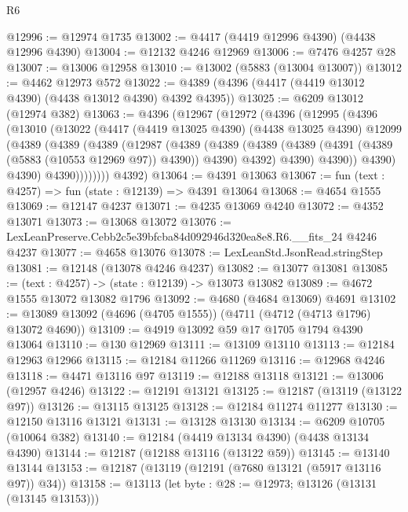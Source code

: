 \begin{lexlean}{R6}
\begin{coremodule}
@12996 := @12974 @1735
@13002 := @4417 (@4419 @12996 @4390) (@4438 @12996 @4390)
@13004 := @12132 @4246 @12969
@13006 := @7476 @4257 @28
@13007 := @13006 @12958
@13010 := @13002 (@5883 (@13004 @13007))
@13012 := @4462 @12973 @572
@13022 := @4389 (@4396 (@4417 (@4419 @13012 @4390) (@4438 @13012 @4390) @4392 @4395))
@13025 := @6209 @13012 (@12974 @382)
@13063 := @4396
    (@12967
      (@12972
        (@4396
          (@12995
            (@4396
              (@13010
                (@13022
                  (@4417
                    (@4419 @13025 @4390)
                    (@4438 @13025 @4390)
                    @12099
                    (@4389
                      (@4389
                        (@4389
                          (@12987
                            (@4389
                              (@4389
                                (@4389
                                  (@4389 (@4391 (@4389 (@5883 (@10553 @12969 @97)) @4390)) @4390)
                                  @4392)
                                @4390)
                              @4390))
                          @4390)
                        @4390)
                      @4390))))))))
      @4392)
@13064 := @4391 @13063
@13067 := fun (text : @4257) => fun (state : @12139) => @4391 @13064
@13068 := @4654 @1555
@13069 := @12147 @4237
@13071 := @4235 @13069 @4240
@13072 := @4352 @13071
@13073 := @13068 @13072
@13076 := LexLeanPreserve.Cebb2c5e39bfcba84d092946d320ea8e8.R6.__fits_24 @4246 @4237
@13077 := @4658 @13076
@13078 := LexLeanStd.JsonRead.stringStep
@13081 := @12148 (@13078 @4246 @4237)
@13082 := @13077 @13081
@13085 := (text : @4257) -> (state : @12139) -> @13073 @13082
@13089 := @4672 @1555 @13072 @13082 @1796
@13092 := @4680 (@4684 @13069) @4691
@13102 := @13089 @13092 (@4696 (@4705 @1555)) (@4711 (@4712 (@4713 @1796) @13072 @4690))
@13109 := @4919 @13092 @59 @17 @1705 @1794 @4390 @13064
@13110 := @130 @12969
@13111 := @13109 @13110
@13113 := @12184 @12963 @12966
@13115 := @12184 @11266 @11269
@13116 := @12968 @4246
@13118 := @4471 @13116 @97
@13119 := @12188 @13118
@13121 := @13006 (@12957 @4246)
@13122 := @12191 @13121
@13125 := @12187 (@13119 (@13122 @97))
@13126 := @13115 @13125
@13128 := @12184 @11274 @11277
@13130 := @12150 @13116 @13121
@13131 := @13128 @13130
@13134 := @6209 @10705 (@10064 @382)
@13140 := @12184 (@4419 @13134 @4390) (@4438 @13134 @4390)
@13144 := @12187 (@12188 @13116 (@13122 @59))
@13145 := @13140 @13144
@13153 := @12187 (@13119 (@12191 (@7680 @13121 (@5917 @13116 @97)) @34))
@13158 := @13113 (let byte : @28 := @12973; @13126 (@13131 (@13145 @13153)))

\end{coremodule}
\end{lexlean}
